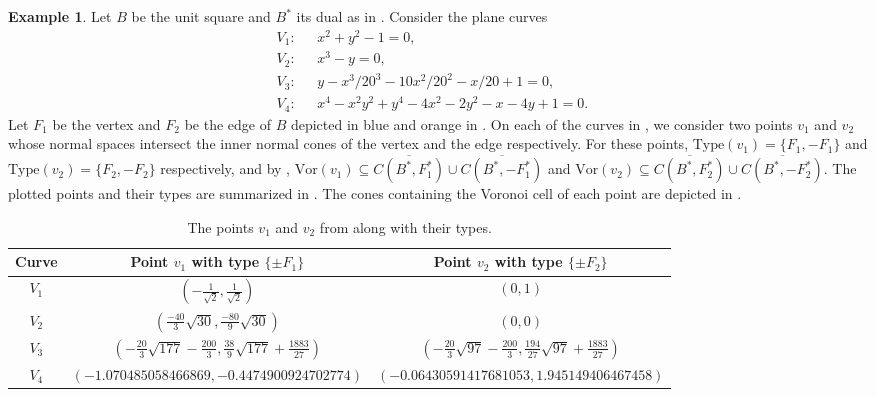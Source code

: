\documentclass{article}
\numberwithin{theorem}{section}
\theoremstyle{definition}
\newtheorem{example}[theorem]{Example}
\theoremstyle{example_contd}
\newcommand{\vor}{\mathrm{Vor}}
\newcommand{\type}{\mathrm{Type}}
\begin{document}
\begin{example}\label{ex:type_plane_curves}
Let $B$ be the unit square and $B^*$ its dual as in . Consider the plane curves 
	\begin{align*}
		V_1:\text{ } & x^2+y^2-1=0,&\\
		V_2:\text{ } & x^3-y=0,& \\
		V_3:\text{ } &y-x^3/20^3-10x^2/20^2-x/20+1=0, &\\
		V_4:\text{ } & x^4 - x^2 y^2 + y^4 - 4 x^2 - 2 y^2 - x - 4 y + 1= 0. &\end{align*}
     Let $F_1$ be the vertex and $F_2$ be the edge of $B$ depicted in blue and orange in .
     On each of the curves in , we consider two points $v_1$ and $v_2$ whose normal spaces intersect the inner normal cones of the vertex and the edge respectively. For these points, $\type(v_1)=\{F_1,-F_1\}$ and $\type(v_2)=\{F_2,-F_2\}$ respectively, and by , $\vor(v_1)\subseteq \overline{C(B^*,F_1^*)}\cup \overline{C(B^*,-F_1^*)}$ and $\vor(v_2)\subseteq \overline{C(B^*,F_2^*)}\cup \overline{C(B^*,-F_2^*)}.$ The plotted points and their types are summarized in . The cones containing the Voronoi cell of each point are depicted in .
     \begin{table}[h]
         \centering
         \begin{tabular}{c|c|c}
             Curve & Point $v_1$ with type $\{\pm F_1\}$ & Point $v_2$ with type $\{\pm F_2\}$  \\
             \hline
              $V_1$ & $\left(-\frac{1}{\sqrt{2}},\frac{1}{\sqrt{2}}\right)$ & $(0,1)$\\
              $V_2$ & $\left(\frac{-40}{3}\sqrt{30},\frac{-80}{9}\sqrt{30}\right)$ & $(0,0)$ \\
              $V_3$ & $\left(-\frac{20}{3}\sqrt{177} - \frac{200}{3}, \frac{38}{9}\sqrt{177} + \frac{1883}{27} \right)$ & $\left(-\frac{20}{3}\sqrt{97} - \frac{200}{3}, \frac{194}{27}\sqrt{97} + \frac{1883}{27}\right)$ \\
              $V_4$ & $(-1.070485058466869, -0.4474900924702774)$ & $(-0.06430591417681053, 1.945149406467458)$
         \end{tabular}
         \caption{The points $v_1$ and $v_2$ from  along with their types.}
         \label{tab:Ex_types_planecurve}
     \end{table}
     
 \end{example}
\end{document}

